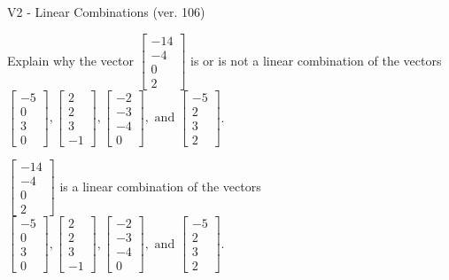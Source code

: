 \begin{exercise}
  \begin{exerciseTitle}V2 - Linear Combinations (ver. 106)\end{exerciseTitle}
  \begin{exerciseStatement}
    Explain why the vector \(\left[\begin{array}{c}
-14 \\
-4 \\
0 \\
2
\end{array}\right]\)  is or is not a linear 
	combination of the vectors \(\left[\begin{array}{c}
-5 \\
0 \\
3 \\
0
\end{array}\right] , \left[\begin{array}{c}
2 \\
2 \\
3 \\
-1
\end{array}\right] , \left[\begin{array}{c}
-2 \\
-3 \\
-4 \\
0
\end{array}\right] , \text{ and } \left[\begin{array}{c}
-5 \\
2 \\
3 \\
2
\end{array}\right]\).
	


  \end{exerciseStatement}
  \begin{exerciseAnswer}
   \(\left[\begin{array}{c}
-14 \\
-4 \\
0 \\
2
\end{array}\right]\) 
  	 is  
	a linear combination of the vectors \(\left[\begin{array}{c}
-5 \\
0 \\
3 \\
0
\end{array}\right] , \left[\begin{array}{c}
2 \\
2 \\
3 \\
-1
\end{array}\right] , \left[\begin{array}{c}
-2 \\
-3 \\
-4 \\
0
\end{array}\right] , \text{ and } \left[\begin{array}{c}
-5 \\
2 \\
3 \\
2
\end{array}\right]\).


\end{exerciseAnswer}
\end{exercise}
